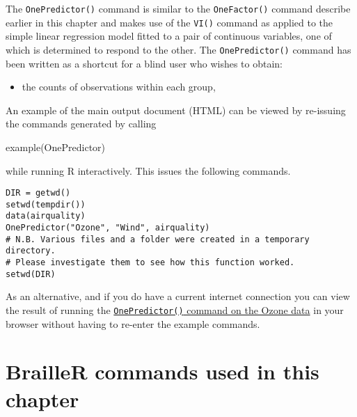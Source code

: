 \documentclass[
]{book}
\newenvironment{Shaded}{\begin{snugshade}}{\end{snugshade}}
\newcommand{\FunctionTok}[1]{\textcolor[rgb]{0.00,0.00,0.00}{#1}}
\newcommand{\NormalTok}[1]{#1}
\providecommand{\tightlist}{%
  \setlength{\itemsep}{0pt}\setlength{\parskip}{0pt}}
\begin{document}
The \texttt{OnePredictor()} command is similar to the \texttt{OneFactor()} command describe earlier in this chapter and makes use of the \texttt{VI()} command as applied to the simple linear regression model fitted to a pair of continuous variables, one of which is determined to respond to the other.
The \texttt{OnePredictor()} command has been written as a shortcut for a blind user who wishes to obtain:

\begin{itemize}
\tightlist
\item
  the counts of observations within each group,
\end{itemize}

An example of the main output document (HTML) can be viewed by re-issuing the commands generated by calling

\begin{Shaded}
\begin{Highlighting}[]
\FunctionTok{example}\NormalTok{(OnePredictor)}
\end{Highlighting}
\end{Shaded}

while running R interactively. This issues the following commands.

\begin{verbatim}
DIR = getwd()
setwd(tempdir())
data(airquality)
OnePredictor("Ozone", "Wind", airquality)
# N.B. Various files and a folder were created in a temporary directory. 
# Please investigate them to see how this function worked.
setwd(DIR)
\end{verbatim}

As an alternative, and if you do have a current internet connection you can view the result of running the \href{https://R-Resources.massey.ac.nz/BrailleRInAction/Ozone-OnePredictor.html}{\texttt{OnePredictor()} command on the Ozone data} in your browser without having to re-enter the example commands.

\hypertarget{brailler-commands-used-in-this-chapter-3}{%
\section{BrailleR commands used in this chapter}\label{brailler-commands-used-in-this-chapter-3}}
\end{document}
